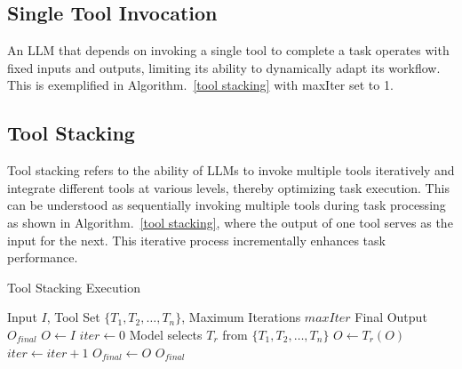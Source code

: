 \subsection{Single Tool Invocation}
An LLM that depends on invoking a single tool to complete a task operates with fixed inputs and outputs, limiting its ability to dynamically adapt its workflow. This is exemplified in Algorithm.~\ref{tool stacking} with maxIter set to 1.


\subsection{Tool Stacking}
Tool stacking refers to the ability of LLMs to invoke multiple tools iteratively and integrate different tools at various levels, thereby optimizing task execution. This can be understood as sequentially invoking multiple tools during task processing as shown in Algorithm.~\ref{tool stacking}, where the output of one tool serves as the input for the next. This iterative process incrementally enhances task performance. 
\begin{algorithm}
\caption{Tool Stacking Execution}
\begin{algorithmic}[1]
\REQUIRE Input $I$, Tool Set $\{T_1, T_2, \dots, T_n\}$, Maximum Iterations $maxIter$
\ENSURE Final Output $O_{final}$
\STATE $O \gets I$
\STATE $iter \gets 0$
    \STATE Model selects $T_r$ from $\{T_1, T_2, \dots, T_n\}$
    \STATE $O \gets T_r(O)$
    \STATE $iter \gets iter + 1$
\ENDWHILE
\STATE $O_{final} \gets O$
\RETURN $O_{final}$
\end{algorithmic}
\label{tool stacking}
\end{algorithm}


